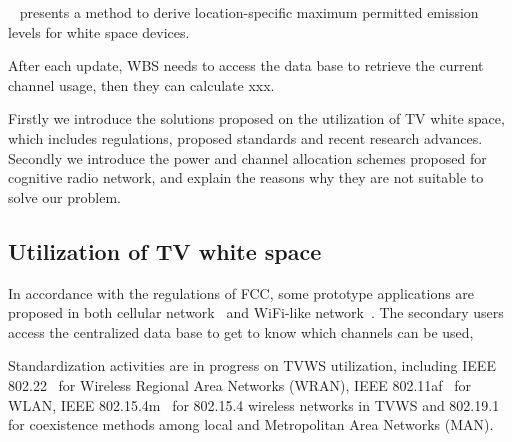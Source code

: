 ~\cite{maximum_power_TVWS_dyspan_2011} presents a method to derive location-specific maximum permitted emission levels for white space devices.


After each update, WBS needs to access the data base to retrieve the current channel usage, then they can calculate xxx.

Firstly we introduce the solutions proposed on the utilization of TV white space, which includes regulations, proposed standards and recent research advances.
Secondly we introduce the power and channel allocation schemes proposed for cognitive radio network, and explain the reasons why they are not suitable to solve our problem.

\subsection{Utilization of TV white space}
In accordance with the regulations of FCC, some prototype applications are proposed in both cellular network~\cite{tvwhite_lte2011, multicell_geo_dyspan11} and WiFi-like network~\cite{whitefi09}.
The secondary users access the centralized data base to get to know which channels can be used, 

Standardization activities are in progress on TVWS utilization, including IEEE 802.22~\cite{802.22} for Wireless Regional Area Networks (\gls{WRAN}), IEEE 802.11af~\cite{802.11af} for WLAN, IEEE 802.15.4m~\cite{802.15.4m} for 802.15.4 wireless networks in TVWS and 802.19.1~\cite{802.19} for coexistence methods among local and Metropolitan Area Networks (\gls{MAN}).


